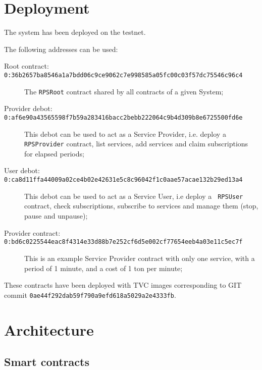 \documentclass[10pt,a4paper]{article}
\begin{document}
\section{Deployment}

The system has been deployed on the testnet.

The following addresses can be used:
\begin{description}
  \item[Root contract: {\tt
      0:36b2657ba8546a1a7bdd06c9ce9062c7e998585a05fc00c03f57dc75546c96c4}]
    The {\tt RPSRoot} contract shared by all contracts of a given
    System;
  \item[Provider debot: {\tt
      0:af6e90a43565598f7b59a283416bacc2bebb222064c9b4d309b8e6725500fd6e}]
    This debot can be used to act as a Service Provider, i.e. deploy a
    {\tt RPSProvider} contract, list services, add services and claim
    subscriptions for elapsed periods;
  \item[User debot: {\tt
      0:ca8d11ffa44009a02ce4b02e42631e5c8c96042f1c0aae57acae132b29ed13a4}]
    This debot can be used to act as a Service User, i.e deploy a {\tt
      RPSUser} contract, check subscriptions, subscribe to services
    and manage them (stop, pause and unpause);
  \item[Provider contract: {\tt
      0:bd6c0225544eac8f4314e33d88b7e252cf6d5e002cf77654eeb4a03e11c5ec7f}]
    This is an example Service Provider contract with only one
    service, with a period of 1 minute, and a cost of 1 ton per
    minute;
    
\end{description}

These contracts have been deployed with TVC images corresponding to
GIT commit {\tt 0ae44f292dab59f790a9efd618a5029a2e4333fb}.

\section{Architecture}

\subsection{Smart contracts}
\end{document}
